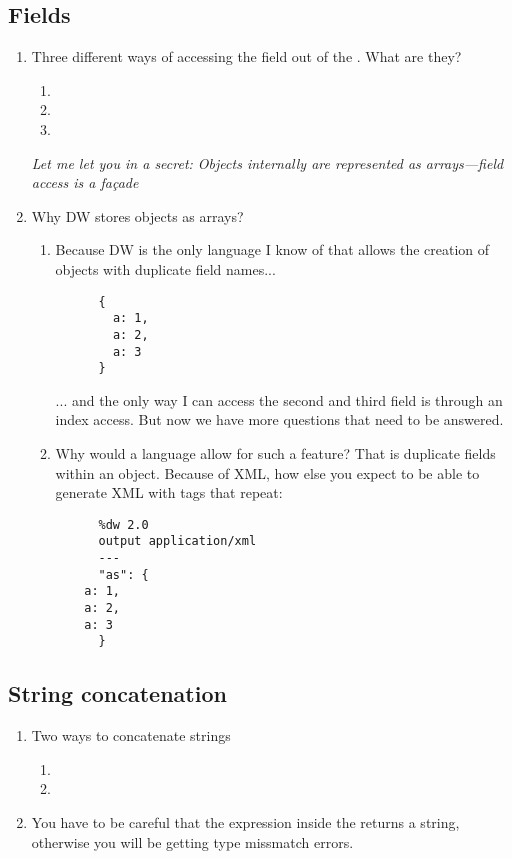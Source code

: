 \subsection{Fields}
\begin{enumerate}[resume*]
\item Three different ways of accessing the field 
  out of the . What are they?
  \begin{enumerate}
  \item {}
  \item {}
  \item {}
  \end{enumerate}
  \emph{Let me let you in a secret: Objects internally are represented as arrays—field access is a façade}
\item Why DW stores objects as arrays?
  \begin{enumerate}
  \item Because DW is the only language I know of that allows the creation of objects with
    duplicate field names...
    \begin{lstlisting}
      {
        a: 1,
        a: 2,
        a: 3
      }
    \end{lstlisting}
    ... and the only way I can access the second and third field is through an index access.
    But now we have more questions that need to be answered.
  \item Why would a language allow for such a feature?  That is duplicate fields within an object.
    Because of XML, how else you expect to be able to generate XML with tags that repeat:
    \begin{lstlisting}
      %dw 2.0
      output application/xml
      ---
      "as": {
	a: 1,
	a: 2,
	a: 3
      }        
    \end{lstlisting}
  \end{enumerate}
\end{enumerate}

\subsection{String concatenation}
\begin{enumerate}[resume*]
\item Two ways to concatenate strings
  \begin{enumerate}
  \item {}
  \item {}
  \end{enumerate}
\item You have to be careful that the expression inside the \ttt{\$\{\}} returns
  a string, otherwise you will be getting type missmatch errors.
\end{enumerate}

